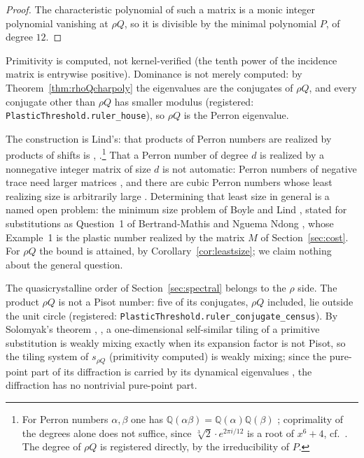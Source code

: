 \documentclass[11pt]{amsart}
\theoremstyle{plain}
\theoremstyle{definition}
\theoremstyle{remark}
\begin{document}
\begin{proof}
The characteristic polynomial of such a matrix is a monic integer polynomial vanishing at
$\rho Q$, so it is divisible by the minimal polynomial $P$, of degree $12$.
\end{proof}

Primitivity is computed, not kernel-verified (the tenth power of the incidence matrix is
entrywise positive). Dominance is not merely computed: by Theorem~\ref{thm:rhoQcharpoly} the
eigenvalues are the conjugates of $\rho Q$, and every conjugate other than $\rho Q$ has smaller
modulus (registered: \texttt{PlasticThreshold.ruler\_house}), so $\rho Q$ is the Perron
eigenvalue.

The construction is Lind's: that products of Perron numbers are realized by products of
shifts is \cite[Thm.~2]{lind1983}, \cite[\S6]{lind1984}.\footnote{For Perron numbers
$\alpha, \beta$ one has $\mathbb{Q}(\alpha\beta) = \mathbb{Q}(\alpha)\mathbb{Q}(\beta)$
\cite[Prop.~5]{lind1984}; coprimality of the degrees alone does not suffice, since
$\sqrt[3]{2}\cdot e^{2\pi i/12}$ is a root of $x^6+4$, cf.\ \cite{virbalas2023}. The degree of
$\rho Q$ is registered directly, by the irreducibility of $P$.} That a Perron number of degree
$d$ is realized by a nonnegative integer matrix of size $d$ is not automatic: Perron numbers of
negative trace need larger matrices \cite[p.~289]{lind1984}, and there are cubic Perron
numbers whose least realizing size is arbitrarily large \cite[Cor.~1.2]{yazdi2021}.
Determining that least size in general is a named open problem: the minimum size problem of
Boyle and Lind \cite{boylelind2002}, stated for substitutions as Question~1 of Bertrand-Mathis
and Nguema Ndong \cite{bertrandmathis2021}, whose Example~1 is the plastic number realized by
the matrix $M$ of Section~\ref{sec:cost}. For $\rho Q$ the bound is attained, by
Corollary~\ref{cor:leastsize}; we claim nothing about the general question.

The quasicrystalline order of Section~\ref{sec:spectral} belongs to the $\rho$ side. The
product $\rho Q$ is not a Pisot number: five of its conjugates, $\rho Q$ included, lie outside
the unit circle (registered: \texttt{PlasticThreshold.ruler\_conjugate\_census}). By
Solomyak's theorem \cite{solomyak1997}, \cite[Thm.~2.15]{solomyak2007}, a one-dimensional
self-similar tiling of a primitive substitution is weakly mixing exactly when its expansion
factor is not Pisot, so the tiling system of $s_{\rho Q}$ (primitivity computed) is weakly
mixing; since the pure-point part of its diffraction is carried by its dynamical eigenvalues
\cite{dworkin1993,baakelenz2004}, the diffraction has no nontrivial pure-point part.
\end{document}
